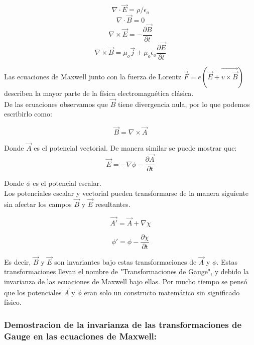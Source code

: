 \documentclass[12pt]{article}
\begin{document}
\begin{equation}
\nabla\cdot\vec{E}=\rho/\epsilon_o
\end{equation}
\begin{equation}
\nabla\cdot\vec{B}=0
\end{equation}
\begin{equation}
\nabla\times\vec{E}=-\frac{\partial\vec{B}}{\partial t}
\end{equation}
\begin{equation}
\nabla\times\vec{B}=\mu_o\vec{j}+\mu_o\epsilon_o\frac{\partial\vec{E}}{\partial t}
\end{equation}



Las ecuaciones de Maxwell junto con la fuerza de Lorentz 
$\vec{F}=e(\vec{E}+\vec{v\times\vec{B}})$ describen la mayor parte de la física electromagnética clásica. \\
De las ecuaciones observamos que $\vec{B}$ tiene divergencia nula, por lo que podemos escribirlo como: 

\begin{equation}
\vec{B}=\nabla\times\vec{A}
\end{equation}


Donde $\vec{A}$ es el potencial vectorial. De manera similar se puede mostrar que:
\begin{equation}
\vec{E}=-\nabla\phi-\frac{\partial\vec{A}}{\partial t}
\end{equation}

Donde $\phi$ es el potencial escalar.\\
Los potenciales escalar y vectorial pueden transformarse de la manera siguiente sin afectar los campos $\vec{B}$ y $\vec{E}$ resultantes.

\begin{equation}
\vec{A'}=\vec{A}+\nabla\chi
\end{equation}

\begin{equation}
\phi'=\phi-\frac{\partial \chi }{\partial t}
\end{equation}



Es decir, $\vec{B}$ y $\vec{E}$ son invariantes bajo estas transformaciones de $\vec{A}$ y $\phi$. Estas transformaciones llevan el nombre de "Transformaciones de Gauge", y debido la invarianza de las ecuaciones de Maxwell bajo ellas. Por mucho tiempo se pensó que los potenciales $\vec{A}$ y $\phi$ eran solo un constructo matemático sin significado físico. 
\subsubsection{\textbf{Demostracion de la invarianza de las transformaciones de Gauge en las ecuaciones de Maxwell:}}
\end{document}
